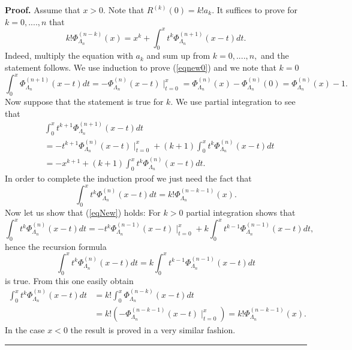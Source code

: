 \documentclass[11pt]{article}%
\newenvironment{proof}[1][Proof]{\textbf{#1.} }{\ \rule{0.5em}{0.5em}}
\begin{document}
\begin{proof}
Assume that $x>0.$ Note that $R^{\left(  k\right)  }\left(  0\right)
=k!a_{k}.$ It suffices to prove for $k=0,....,n$ that%
\begin{equation}
k!\Phi_{\Lambda_{n}}^{\left(  n-k\right)  }\left(  x\right)  =x^{k}+\int
_{0}^{x}t^{k}\Phi_{\Lambda_{n}}^{\left(  n+1\right)  }\left(  x-t\right)  dt.
\label{eqnew0}%
\end{equation}
Indeed, multiply the equation with $a_{k}$ and sum up from $k=0,....,n,$ and
the statement follows. We use induction to prove (\ref{eqnew0}) and we note
that $k=0$
\[
\int_{0}^{x}\Phi_{\Lambda_{n}}^{\left(  n+1\right)  }\left(  x-t\right)
dt=-\Phi_{\Lambda_{n}}^{\left(  n\right)  }\left(  x-t\right)  \mid_{t=0}%
^{x}=\Phi_{\Lambda_{n}}^{\left(  n\right)  }\left(  x\right)  -\Phi
_{\Lambda_{n}}^{\left(  n\right)  }\left(  0\right)  =\Phi_{\Lambda_{n}%
}^{\left(  n\right)  }\left(  x\right)  -1.
\]
Now suppose that the statement is true for $k.$ We use partial integration to
see that
\begin{align*}
&  \int_{0}^{x}t^{k+1}\Phi_{\Lambda_{n}}^{\left(  n+1\right)  }\left(
x-t\right)  dt\\
&  =-t^{k+1}\Phi_{\Lambda_{n}}^{\left(  n\right)  }\left(  x-t\right)
\mid_{t=0}^{x}+\left(  k+1\right)  \int_{0}^{x}t^{k}\Phi_{\Lambda_{n}%
}^{\left(  n\right)  }\left(  x-t\right)  dt\\
&  =-x^{k+1}+\left(  k+1\right)  \int_{0}^{x}t^{k}\Phi_{\Lambda_{n}}^{\left(
n\right)  }\left(  x-t\right)  dt.
\end{align*}
In order to complete the induction proof we just need the fact that
\begin{equation}
\int_{0}^{x}t^{k}\Phi_{\Lambda_{n}}^{\left(  n\right)  }\left(  x-t\right)
dt=k!\Phi_{\Lambda_{n}}^{\left(  n-k-1\right)  }\left(  x\right)  .
\label{eqNew}%
\end{equation}
Now let us show that (\ref{eqNew}) holds: For $k>0$ partial integration shows
that
\[
\int_{0}^{x}t^{k}\Phi_{\Lambda_{n}}^{\left(  n\right)  }\left(  x-t\right)
dt=-t^{k}\Phi_{\Lambda_{n}}^{\left(  n-1\right)  }\left(  x-t\right)
\mid_{t=0}^{x}+k\int_{0}^{x}t^{k-1}\Phi_{\Lambda_{n}}^{\left(  n-1\right)
}\left(  x-t\right)  dt,
\]
hence the recursion formula
\[
\int_{0}^{x}t^{k}\Phi_{\Lambda_{n}}^{\left(  n\right)  }\left(  x-t\right)
dt=k\int_{0}^{x}t^{k-1}\Phi_{\Lambda_{n}}^{\left(  n-1\right)  }\left(
x-t\right)  dt
\]
is true. From this one easily obtain
\begin{align*}
\int_{0}^{x}t^{k}\Phi_{\Lambda_{n}}^{\left(  n\right)  }\left(  x-t\right)
dt  &  =k!\int_{0}^{x}\Phi_{\Lambda_{n}}^{\left(  n-k\right)  }\left(
x-t\right)  dt\\
&  =k!\left(  -\Phi_{\Lambda_{n}}^{\left(  n-k-1\right)  }\left(  x-t\right)
\mid_{t=0}^{x}\right)  =k!\Phi_{\Lambda_{n}}^{\left(  n-k-1\right)  }\left(
x\right)  .
\end{align*}
In the case $x<0$ the result is proved in a very similar fashion.
\end{proof}
\end{document}
